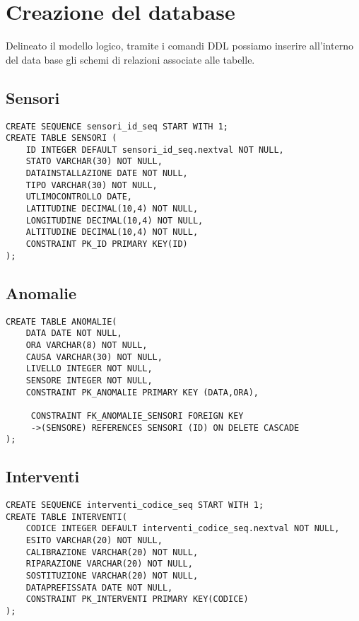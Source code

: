 \section{Creazione del database}
Delineato il modello logico, tramite i comandi DDL possiamo inserire all'interno del data base gli schemi di relazioni associate alle tabelle.
\begin{description}

\subsection{Sensori}
\begin{verbatim}
CREATE SEQUENCE sensori_id_seq START WITH 1;
CREATE TABLE SENSORI (
    ID INTEGER DEFAULT sensori_id_seq.nextval NOT NULL,
    STATO VARCHAR(30) NOT NULL,
    DATAINSTALLAZIONE DATE NOT NULL,
    TIPO VARCHAR(30) NOT NULL,
    UTLIMOCONTROLLO DATE,
    LATITUDINE DECIMAL(10,4) NOT NULL,
    LONGITUDINE DECIMAL(10,4) NOT NULL,
    ALTITUDINE DECIMAL(10,4) NOT NULL,
    CONSTRAINT PK_ID PRIMARY KEY(ID)
);
\end{verbatim}

\subsection{Anomalie}
\begin{verbatim}
CREATE TABLE ANOMALIE(
    DATA DATE NOT NULL,
    ORA VARCHAR(8) NOT NULL,
    CAUSA VARCHAR(30) NOT NULL,
    LIVELLO INTEGER NOT NULL,
    SENSORE INTEGER NOT NULL,
    CONSTRAINT PK_ANOMALIE PRIMARY KEY (DATA,ORA),
     
     CONSTRAINT FK_ANOMALIE_SENSORI FOREIGN KEY
     ->(SENSORE) REFERENCES SENSORI (ID) ON DELETE CASCADE
);
\end{verbatim}

\subsection{Interventi}
\begin{verbatim}
CREATE SEQUENCE interventi_codice_seq START WITH 1;
CREATE TABLE INTERVENTI(
    CODICE INTEGER DEFAULT interventi_codice_seq.nextval NOT NULL,
    ESITO VARCHAR(20) NOT NULL,
    CALIBRAZIONE VARCHAR(20) NOT NULL,
    RIPARAZIONE VARCHAR(20) NOT NULL,
    SOSTITUZIONE VARCHAR(20) NOT NULL,
    DATAPREFISSATA DATE NOT NULL,
    CONSTRAINT PK_INTERVENTI PRIMARY KEY(CODICE)
);
\end{verbatim}


\end{description}
